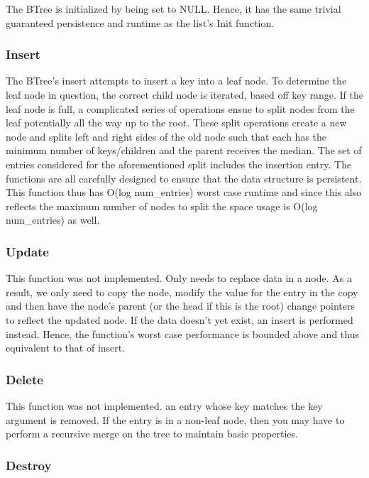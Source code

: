 \documentclass[twocolumn]{article}
\begin{document}
The BTree is initialized by being set to NULL. Hence, it has the same trivial
guaranteed persistence and runtime as the list's Init function.

\subsubsection{Insert}

The BTree's insert attempts to insert a key into a leaf node. To determine the
leaf node in question, the correct child node is iterated, based off key range.
If the leaf node is full, a complicated series of operations ensue to split
nodes from the leaf potentially all the way up to the root. These split
operations create a new node and splits left and right sides of the old node
such that each has the minimum number of keys/children and the parent receives
the median. The set of entries considered for the aforementioned split includes
the insertion entry. The functions are all carefully designed to ensure that the
data structure is persistent. This function thus has O(log num\_entries) worst
case runtime and since this also reflects the maximum number of nodes to split
the space usage is O(log num\_entries) as well.

\subsubsection{Update}

This function was not implemented. Only needs to replace data in a node. As a
result, we only need to copy the node, modify the value for the entry in the
copy and then have the node's parent (or the head if this is the root) change
pointers to reflect the updated node. If the data doesn't yet exist, an insert
is performed instead. Hence, the function's worst case performance is bounded
above and thus equivalent to that of insert.

\subsubsection{Delete}

This function was not implemented. an entry whose key matches the key argument
is removed. If the entry is in a non-leaf node, then you may have to perform a
recursive merge on the tree to maintain basic properties.

\subsubsection{Destroy}
\end{document}
